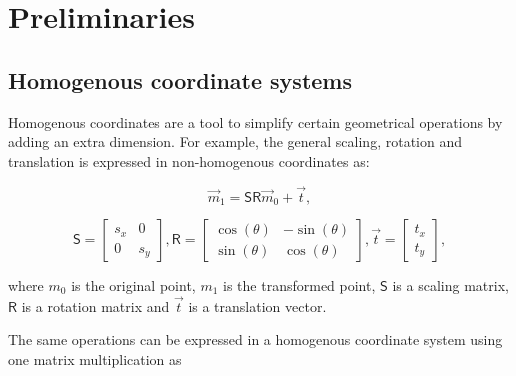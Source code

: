 \chapter{Preliminaries}

\label{chapter:preliminaries}
\section{Homogenous coordinate systems}

Homogenous coordinates are a tool to simplify certain geometrical operations by adding an extra dimension.
For example, the general scaling, rotation and translation is expressed in non-homogenous coordinates as:

\begin{equation}
    \vec{m}_1 = 
    \pmb{\mathsf{S}} \pmb{\mathsf{R}}
    \vec{m}_0
    + \vec{t},
\end{equation}

\begin{equation}
    \pmb{\mathsf{S}} = \begin{bmatrix} s_x & 0 \\ 0 & s_y \end{bmatrix}, \pmb{\mathsf{R}} = \begin{bmatrix} \cos(\theta) & -\sin(\theta) \\ \sin(\theta) & \cos(\theta) \end{bmatrix}, \vec{t} = \begin{bmatrix} t_x \\ t_y \end{bmatrix},
\end{equation}

where $m_0$ is the original point,
$m_1$ is the transformed point,
$\pmb{\mathsf{S}}$ is a scaling matrix,
$\pmb{\mathsf{R}}$ is a rotation matrix and 
$\vec{t}$ is a translation vector.

The same operations can be expressed in a homogenous coordinate system using one matrix multiplication as

